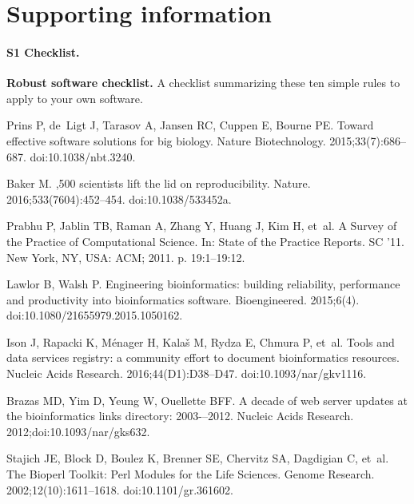 \documentclass[10pt,letterpaper]{article}
\begin{document}
\section*{Supporting information}

\paragraph*{S1 Checklist.}
\label{S1_Checklist}
{\bf Robust software checklist.} A checklist summarizing these ten simple rules
to apply to your own software.

\begin{thebibliography}{10}

Prins P, de~Ligt J, Tarasov A, Jansen RC, Cuppen E, Bourne PE.
\newblock Toward effective software solutions for big biology.
\newblock Nature Biotechnology. 2015;33(7):686--687.
\newblock doi:{10.1038/nbt.3240}.

Baker M.
,500 scientists lift the lid on reproducibility.
\newblock Nature. 2016;533(7604):452--454.
\newblock doi:{10.1038/533452a}.

Prabhu P, Jablin TB, Raman A, Zhang Y, Huang J, Kim H, et~al.
\newblock A Survey of the Practice of Computational Science.
\newblock In: State of the Practice Reports. SC '11. New York, NY, USA: ACM;
  2011. p. 19:1--19:12.

Lawlor B, Walsh P.
\newblock Engineering bioinformatics: building reliability, performance and
  productivity into bioinformatics software.
\newblock Bioengineered. 2015;6(4).
\newblock doi:{10.1080/21655979.2015.1050162}.

Ison J, Rapacki K, Ménager H, Kalaš M, Rydza E, Chmura P, et~al.
\newblock Tools and data services registry: a community effort to document
  bioinformatics resources.
\newblock Nucleic Acids Research. 2016;44(D1):D38--D47.
\newblock doi:{10.1093/nar/gkv1116}.

Brazas MD, Yim D, Yeung W, Ouellette BFF.
\newblock A decade of web server updates at the bioinformatics links directory:
  2003-–2012.
\newblock Nucleic Acids Research. 2012;doi:{10.1093/nar/gks632}.

Stajich JE, Block D, Boulez K, Brenner SE, Chervitz SA, Dagdigian C, et~al.
\newblock The Bioperl Toolkit: Perl Modules for the Life Sciences.
\newblock Genome Research. 2002;12(10):1611--1618.
\newblock doi:{10.1101/gr.361602}.


\end{thebibliography}
\end{document}
